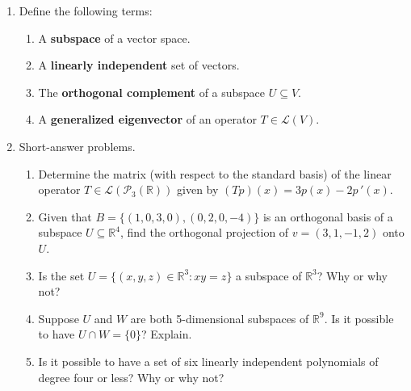 \documentclass[12pt]{article}
\newcommand{\points}[1]{\marginpar{\hspace{24pt}[#1]}}
\newcommand{\R}{\mathbb{R}}
\renewcommand{\L}{\mathcal{L}}
\begin{document}
\begin{enumerate}
\item Define the following terms:
\begin{enumerate}
 \item A {\bf subspace} of a vector space.\points{2}

\vspace{2in}

 \item A {\bf linearly independent} set of vectors. \points{2}

\vspace{2in}

 \item The {\bf orthogonal complement} of a subspace $U\subseteq V$. \points{2}

\vspace{2in}

 \item A {\bf generalized eigenvector} of an operator $T\in\L(V)$. \points{2}

\end{enumerate}
\newpage

\item Short-answer problems.
\begin{enumerate}
 \item Determine the matrix (with respect to the standard basis) of the linear operator $T\in\L(\mathcal{P}_3(\R))$ given by $(Tp)(x) = 3p(x)-2p\,'(x)$. \points{3}

\vspace{2.75in}

 \item Given that $B=\{(1,0,3,0),(0,2,0,-4)\}$ is an orthogonal basis of a subspace $U\subseteq \R^4$, find the orthogonal projection of $v=(3,1,-1,2)$ onto $U$.\points{3}

\vspace{2.75in}

 
 \item Is the set $U=\{(x,y,z)\in\R^3 : xy=z\}$ a subspace of $\R^3$? Why or why not? \points{3}

\newpage

 \item Suppose $U$ and $W$ are both 5-dimensional subspaces of $\R^9$. Is it possible to have $U\cap W=\{0\}$? Explain. \points{3}

\vspace{2.5in}

 \item Is it possible to have a set of six linearly independent polynomials of degree four or less? Why or why not? \points{3}


\end{enumerate}
\end{enumerate}
\end{document}
